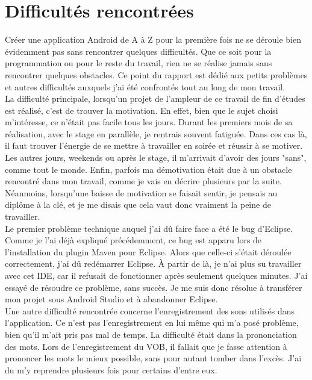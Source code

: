 \section{Difficultés rencontrées\label{diff}}
Créer une application Android de A à Z pour la première fois ne se déroule bien évidemment pas sans rencontrer quelques difficultés. Que ce soit pour la programmation ou pour le reste du travail, rien ne se réalise jamais sans rencontrer quelques obstacles. Ce point du rapport est dédié aux petits problèmes et autres difficultés auxquels j'ai été confrontés tout au long de mon travail.\\

La difficulté principale, lorsqu'un projet de l'ampleur de ce travail de fin d'études est réalisé, c'est de trouver la motivation. En effet, bien que le sujet choisi m'intéresse, ce n'était pas facile tous les jours. Durant les premiers mois de sa réalisation, avec le stage en parallèle, je rentrais souvent fatiguée. Dans ces cas là, il faut trouver l'énergie de se mettre à travailler en soirée et réussir à se motiver. Les autres jours, weekends ou après le stage, il m'arrivait d'avoir des jours "sans", comme tout le monde. Enfin, parfois ma démotivation était due à un obstacle rencontré dans mon travail, comme je vais en décrire plusieurs par la suite. Néanmoins, lorsqu'une baisse de motivation se faisait sentir, je pensais au diplôme à la clé, et je me disais que cela vaut donc vraiment la peine de travailler.\\

Le premier problème technique auquel j'ai dû faire face a été le bug d'Eclipse. Comme je l'ai déjà expliqué précédemment, ce bug est apparu lors de l'installation du plugin Maven pour Eclipse. Alors que celle-ci s'était déroulée correctement, j'ai dû redémarrer Eclipse. À partir de là, je n'ai plus su travailler avec cet IDE, car il refusait de fonctionner après seulement quelques minutes. J'ai essayé de résoudre ce problème, sans succès. Je me suis donc résolue à transférer mon projet sous Android Studio et à abandonner Eclipse.\\

Une autre difficulté rencontrée concerne l'enregistrement des sons utilisés dans l'application. Ce n'est pas l'enregistrement en lui même qui m'a posé problème, bien qu'il m'ait pris pas mal de temps. La difficulté était dans la prononciation des mots. Lors de l'enregistrement du VOB, il fallait que je fasse attention à prononcer les mots le mieux possible, sans pour autant tomber dans l'excès. J'ai du m'y reprendre plusieurs fois pour certains d'entre eux.\\

